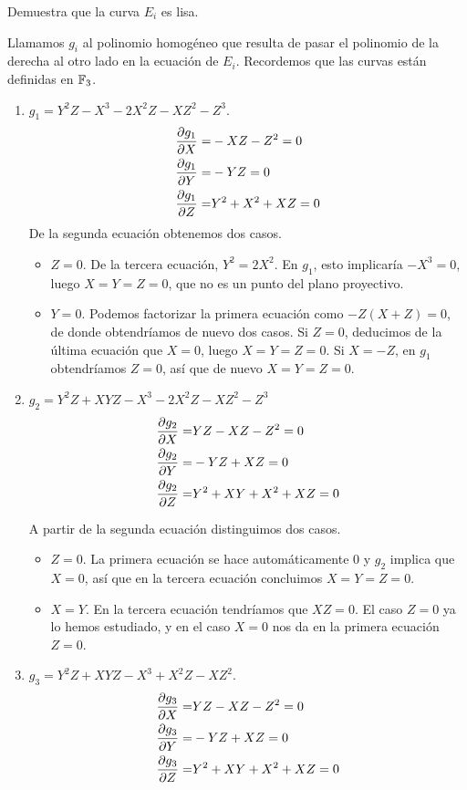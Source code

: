 \documentclass[twoside]{article}
\begin{document}
\begin{ejercicio}{6}
Demuestra que la curva $E_i$ es lisa.
\end{ejercicio}
\begin{solucion}
Llamamos $g_i$ al polinomio homogéneo que resulta de pasar el polinomio de la derecha al otro lado en la ecuación de $E_i$. Recordemos que las curvas están definidas en $\mathbb{F}_3$.

\begin{enumerate}
\item $g_1=Y^2Z-X^3-2X^2Z-XZ^2-Z^3$.
\begin{align*}
\frac{\partial g_1}{\partial X}=&-XZ-Z^2=0\\
\frac{\partial g_1}{\partial Y}=&-YZ=0\\
\frac{\partial g_1}{\partial Z}=&Y^2+X^2+XZ=0
\end{align*}
De la segunda ecuación obtenemos dos casos.
\begin{itemize}
\item $Z=0$. De la tercera ecuación, $Y^2=2X^2$. En $g_1$, esto implicaría $-X^3=0$, luego $X=Y=Z=0$, que no es un punto del plano proyectivo.
\item $Y=0$. Podemos factorizar la primera ecuación como $-Z(X+Z)=0$, de donde obtendríamos de nuevo dos casos. Si $Z=0$, deducimos de la última ecuación que $X=0$, luego $X=Y=Z=0$. Si $X=-Z$, en $g_1$ obtendríamos $Z=0$, así que de nuevo $X=Y=Z=0$. 
\end{itemize}

\item $g_2=Y^2Z + XYZ - X^3 - 2X^2Z - XZ^2 - Z^3$
\begin{align*}
\frac{\partial g_2}{\partial X}=& YZ-XZ-Z^2=0\\
\frac{\partial g_2}{\partial Y}=& -YZ+XZ=0\\
\frac{\partial g_2}{\partial Z}=& Y^2+XY+X^2+XZ=0
\end{align*}

A partir de la segunda ecuación distinguimos dos casos.
\begin{itemize}
\item $Z=0$. La primera ecuación se hace automáticamente 0 y $g_2$ implica que $X=0$, así que en la tercera ecuación concluimos $X=Y=Z=0$.
\item $X=Y$. En la tercera ecuación tendríamos que $XZ=0$. El caso $Z=0$ ya lo hemos estudiado, y en el caso $X=0$ nos da en la primera ecuación $Z=0$. 
\end{itemize}

\item $g_3=Y^2Z + XYZ - X^3 +X^2Z - XZ^2$.
\begin{align*}
\frac{\partial g_3}{\partial X}=& YZ-XZ-Z^2=0\\
\frac{\partial g_3}{\partial Y}=& -YZ+XZ=0\\
\frac{\partial g_3}{\partial Z}=& Y^2+XY+X^2+XZ=0
\end{align*}


\end{enumerate}
\end{solucion}
\end{document}
